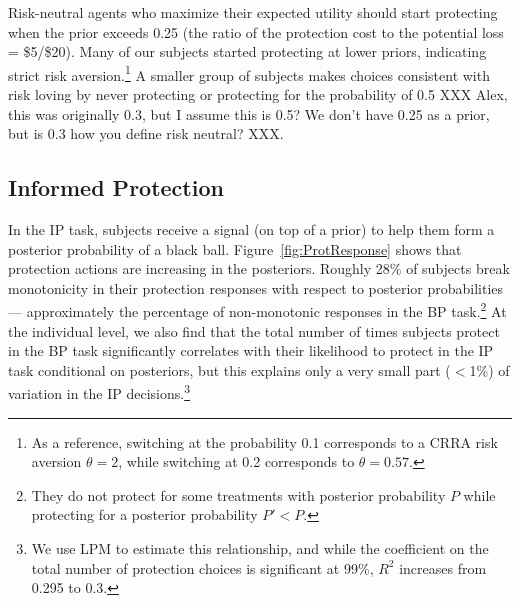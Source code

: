 \documentclass[12pt,a4paper]{article}
\newcommand{\agt}[1]{{\color{OliveGreen}#1}}
\begin{document}
Risk-neutral agents who maximize their expected utility should start protecting when the prior exceeds 0.25 (the ratio of the protection cost to the potential loss = \$5/\$20). Many of our subjects started protecting at lower priors, indicating strict risk aversion.\footnote{As a reference, switching at the probability 0.1 corresponds to a CRRA risk aversion $\theta=2$, while switching at 0.2 corresponds to $\theta=0.57$.}  A smaller group of subjects makes choices consistent with risk loving by never protecting or protecting for the probability of 0.5 \agt{XXX Alex, this was originally 0.3, but I assume this is 0.5? We don't have 0.25 as a prior, but is 0.3 how you define risk neutral? XXX}. 

\subsection{Informed Protection}

In the IP task, subjects receive a signal (on top of a prior) to help them form a posterior probability of a black ball. 
Figure~\ref{fig:ProtResponse} shows that protection actions are increasing in the posteriors. Roughly 28\% of subjects break monotonicity in their protection responses with respect to posterior probabilities --- approximately the percentage of non-monotonic responses in the BP task.\footnote{ They do not protect for some treatments with posterior probability $P$ while protecting for a posterior probability $P'<P$.}  At the individual level, we also find that the total number of times subjects protect in the BP task significantly correlates with their likelihood to protect in the IP task conditional on posteriors, but this explains only a very small part ($<$1\%) of variation in the IP decisions.\footnote{We use LPM to estimate this relationship, and while the coefficient on the total number of protection choices is significant at 99\%, $R^2$ increases from 0.295 to 0.3.} 


\end{document}
